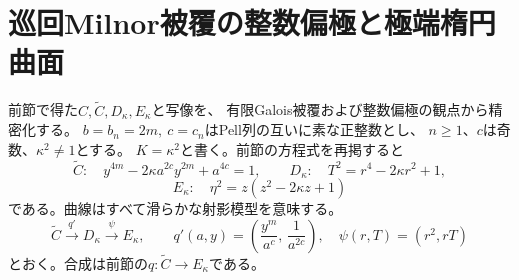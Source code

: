 \section{巡回Milnor被覆の整数偏極と極端楕円曲面}
\label{sec:prym-integral-polarization}
前節で得た$C,\widetilde C,D_\kappa,E_\kappa$と写像を、
有限Galois被覆および整数偏極の観点から精密化する。
$b=b_n=2m,\ c=c_n$はPell列の互いに素な正整数とし、
$n\ge1$、$c$は奇数、$\kappa^2\ne1$とする。
$K=\kappa^2$と書く。前節の方程式を再掲すると
\[
 \widetilde C:\quad y^{4m}-2\kappa a^{2c}y^{2m}+a^{4c}=1,
 \qquad
 D_\kappa:\quad T^2=r^4-2\kappa r^2+1,
\]
\[
 E_\kappa:\quad \eta^2=z(z^2-2\kappa z+1)
\]
である。曲線はすべて滑らかな射影模型を意味する。
\begin{equation}\label{eq:cyclic-prym-factorization}
 \widetilde C\xrightarrow{\,q'\,}D_\kappa
 \xrightarrow{\,\psi\,}E_\kappa,\qquad
 q'(a,y)=\left(\frac{y^m}{a^c},\,\frac1{a^{2c}}\right),
 \quad \psi(r,T)=(r^2,rT)
\end{equation}
とおく。合成は前節の$ q:\widetilde C\to E_\kappa$である。

